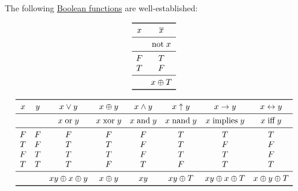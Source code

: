 \begin{proposition}\label{thm:standard_boolean_functions}
  The following \hyperref[def:boolean_function]{Boolean functions} are well-established:
  \small
  \begin{paracol}{2}
    \begin{leftcolumn}
      \begin{equation*}
        \begin{array}{*{2}{c}}
          \toprule
          x & \oline{x}  \\
          \midrule
            & \T{not} x  \\
          \midrule
          F & T          \\
          T & F          \\
          \midrule
            & x \oplus T \\
          \bottomrule
        \end{array}
      \end{equation*}
    \end{leftcolumn}

    \begin{rightcolumn}
      \begin{equation*}
        \begin{array}{*{8}{c}}
          \toprule
          x & y & x \vee y             & x \oplus y  & x \wedge y  & x \uparrow y & x \rightarrow y      & x \leftrightarrow y \\
          \midrule
            &   & x \T{or} y           & x \T{xor} y & x \T{and} y & x \T{nand} y & x \T{implies} y      & x \T{iff} y         \\
          \midrule
          F & F & F                    & F           & F           & T            & T                    & T                   \\
          T & F & T                    & T           & F           & T            & F                    & F                   \\
          F & T & T                    & T           & F           & T            & T                    & F                   \\
          T & T & T                    & F           & T           & F            & T                    & T                   \\
          \midrule
            &   & xy \oplus x \oplus y & x \oplus y  & xy          & xy \oplus T  & xy \oplus x \oplus T & x \oplus y \oplus T \\
          \bottomrule
        \end{array}
      \end{equation*}
    \end{rightcolumn}
  \end{paracol}
  \normalsize
  \columnratio{}


\end{proposition}
